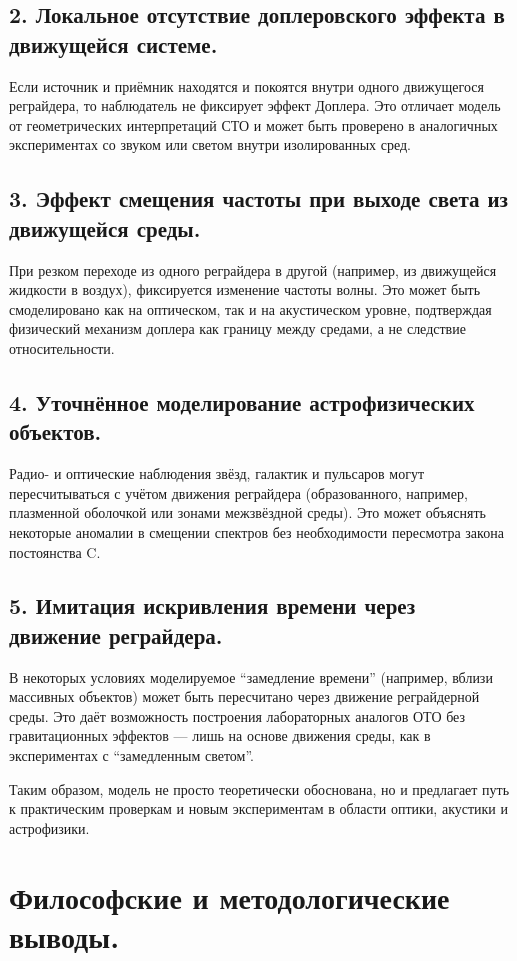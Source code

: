 \documentclass[12pt]{article}
\begin{document}
\subsection*{2. Локальное отсутствие доплеровского эффекта в движущейся системе.}
Если источник и приёмник находятся и покоятся внутри одного движущегося реграйдера, то наблюдатель не фиксирует эффект Доплера. Это отличает модель от геометрических интерпретаций СТО и может быть проверено в аналогичных экспериментах со звуком или светом внутри изолированных сред.

\subsection*{3. Эффект смещения частоты при выходе света из движущейся среды.}
При резком переходе из одного реграйдера в другой (например, из движущейся жидкости в воздух), фиксируется изменение частоты волны. Это может быть смоделировано как на оптическом, так и на акустическом уровне, подтверждая физический механизм доплера как границу между средами, а не следствие относительности.

\subsection*{4. Уточнённое моделирование астрофизических объектов.}
Радио- и оптические наблюдения звёзд, галактик и пульсаров могут пересчитываться с учётом движения реграйдера (образованного, например, плазменной оболочкой или зонами межзвёздной среды). Это может объяснять некоторые аномалии в смещении спектров без необходимости пересмотра закона постоянства C.

\subsection*{5. Имитация искривления времени через движение реграйдера.}
В некоторых условиях моделируемое “замедление времени” (например, вблизи массивных объектов) может быть пересчитано через движение реграйдерной среды. Это даёт возможность построения лабораторных аналогов ОТО без гравитационных эффектов — лишь на основе движения среды, как в экспериментах с “замедленным светом”.

Таким образом, модель не просто теоретически обоснована, но и предлагает путь к практическим проверкам и новым экспериментам в области оптики, акустики и астрофизики.

\section*{Философские и методологические выводы.}
\end{document}
